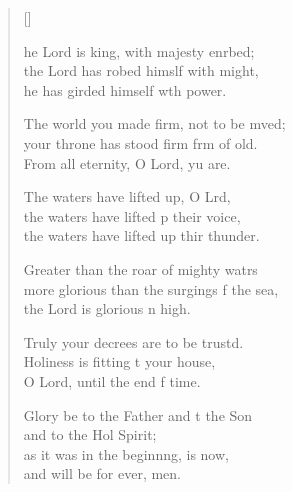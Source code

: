 \settowidth{\versewidth}{more glorious than the surgings of the sea, *}
\begin{verse}[\versewidth]
  \begin{patverse}
he Lord is king, with majesty enrbed;\Flex\\
    the Lord has robed himslf with might,\Med\\
    he has girded himself w\pointup{\i}th power.

The world you made firm, not to be mved;\Flex\\
    your throne has stood firm frm of old.\Med\\
    From all eternity, O Lord, yu are.

The waters have lifted up, O Lrd,\Flex\\
    the waters have lifted p their voice,\Med\\
    the waters have lifted up thir thunder.

Greater than the roar of mighty watrs\Flex\\
    more glorious than the surgings f the sea,\Med\\
    the Lord is glorious n high.

Truly your decrees are to be trustd.\Flex\\
    Holiness is fitting t your house,\Med\\
    O Lord, until the end f time.

Glory be to the Father and t the Son\Med\\
    and to the Hol Spirit;\\
as it was in the beginn\pointup{\i}ng, is now,\Med\\
    and will be for ever, men.
  \end{patverse}
\end{verse}
